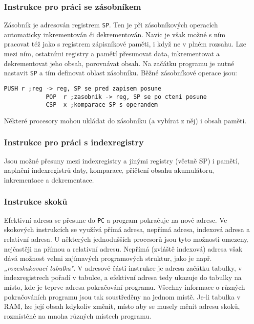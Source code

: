         \subsubsection{Instrukce pro práci se zásobníkem} 
          Zásobník je adresován registrem \texttt{SP}. Ten je při zásobníkových operacích 
          automaticky inkrementován či dekrementován. Navíc je však možné s ním pracovat též jako s 
          registrem zápisníkové paměti, i když ne v plném rozsahu. Lze mezi ním, ostatními registry 
          a pamětí přesunovat data, inkrementovat a dekrementovat jeho obsah, porovnávat obsah. Na 
          začátku programu je nutné nastavit \texttt{SP} a tím definovat oblast zásobníku. Běžné 
          zásobníkové operace jsou:
          \begin{lstlisting}[style=luaMITASMStyle]
            PUSH r ;reg -> reg, SP se pred zapisem posune
            POP  r ;zasobnik -> reg, SP se po cteni posune
            CSP  x ;komparace SP s operandem
          \end{lstlisting}
          Některé procesory mohou ukládat do zásobníku (a vybírat z něj) i obsah paměti.
          
        \subsubsection{Instrukce pro práci s indexregistry}
          Jsou možné přesuny mezi indexregistry a jinými registry (včetně SP) i pamětí, naplnění 
          indexregistrů daty, komparace, přičtení obsahu akumulátoru, inkrementace a dekrementace.
          
        \subsubsection{Instrukce skoků}
          Efektivní adresa se přesune do \texttt{PC} a program pokračuje na nové adrese. Ve
          skokových instrukcích se využívá přímá adresa, nepřímá adresa, indexová adresa a relativní
          adresa. U některých jednodušších procesorů jsou tyto možnosti omezeny, nejčastěji na
          přímou a relativní adresu. Nepřímá (zvláště indexová) adresa však dává možnost velmi
          zajímavých programových struktur, jako je např. \emph{„rozeskakovací tabulka"}. V adresové
          části instrukce je adresa začátku tabulky, v indexregistrech pořadí v tabulce, a efektivní
          adresa tedy ukazuje do tabulky na místo, kde je teprve adresa pokračování programu.
          Všechny informace o různých pokračováních programu jsou tak soustředěny na jednom místě.
          Je-li tabulka v RAM, lze její obsah kdykoliv změnit, místo aby se musely měnit adresu
          skoků, rozmístěné na mnoha různých místech programu.
          
